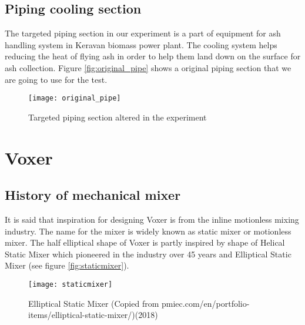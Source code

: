 \subsection{Piping cooling section}

The targeted piping section in our experiment is a part of equipment for ash handling system in Keravan biomass power plant. The cooling system helps reducing the heat of flying ash in order to help them land down on the surface for ash collection. Figure \vref{fig:original_pipe} shows a original piping section that we are going to use for the test. 

\begin{figure}[h]
  \centering
  \texttt{[image: original\_pipe]}
  \caption{ Targeted piping section altered in the experiment}
  \label{fig:original_pipe}
\end{figure}

\section{Voxer}

\subsection{History of mechanical mixer}

It is said that inspiration for designing Voxer is from the inline motionless mixing industry. The name for the mixer is widely known as static mixer or motionless mixer. The half elliptical shape of Voxer is partly inspired by shape of Helical Static Mixer which pioneered in the industry over 45 years \cite{stamixco:web} and Elliptical Static Mixer (see figure \vref{fig:staticmixer}).  

\begin{figure}[h]
  \centering
  \texttt{[image: staticmixer]}
  \caption{ Elliptical Static Mixer (Copied from pmiec.com/en/portfolio-items/elliptical-static-mixer/)(2018) \cite{static:web}}
  \label{fig:staticmixer}
\end{figure}

